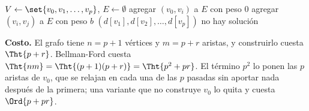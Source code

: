 \documentclass[11pt,letterpaper]{article}
\begin{document}
\begin{algorithm}[H]
\caption{\textsc{Resolver-Restricciones}$(p, R)$}
\label{alg:resolver-restricciones}
\begin{algorithmic}[1]
  \State $V \gets \set{v_0, v_1, \dots, v_p}$, \quad $E \gets \emptyset$
    \State agregar $(v_0, v_i)$ a $E$ con peso $0$
  \EndFor
    \State agregar $(v_i, v_j)$ a $E$ con peso $b$
  \EndFor
    \State \Return $(d[v_1], d[v_2], \dots, d[v_p])$
  \Else
    \State \Return no hay solución 
  \EndIf
\EndProcedure
\end{algorithmic}
\end{algorithm}

\textbf{Costo.} El grafo tiene $n = p + 1$ vértices y $m = p + r$
aristas, y construirlo cuesta $\Tht{p + r}$. Bellman-Ford cuesta
$\Tht{nm} = \Tht{(p + 1)(p + r)} = \Tht{p^2 + pr}$. El término $p^2$
lo ponen las $p$ aristas de $v_0$, que se relajan en cada una de las
$p$ pasadas sin aportar nada después de la primera; una variante que
no construye $v_0$ lo quita y cuesta $\Ord{p + pr}$.
\end{document}
